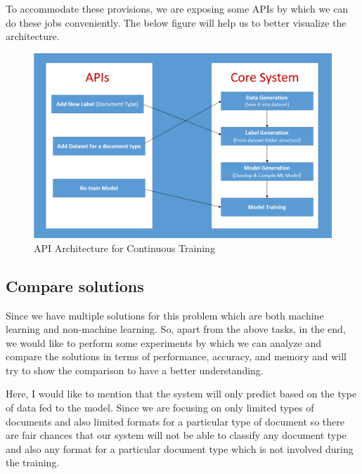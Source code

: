 \par
To accommodate these provisions, we are exposing some APIs by which we can do these jobs conveniently. The below figure will help us to better visualize the architecture.
\begin{figure}[H]
\centering
\includegraphics[scale=0.7]{images/Chapter1/API.PNG}
\caption{API Architecture for Continuous Training}
\label{api-arch-ct}
\end{figure}
\par
\subsection{Compare solutions}
Since we have multiple solutions for this problem which are both machine learning and non-machine learning. So, apart from the above tasks, in the end, we would like to perform some experiments by which we can analyze and compare the solutions in terms of performance, accuracy, and memory and will try to show the comparison to have a better understanding.
\par
Here, I would like to mention that the system will only predict based on the type of data fed to the model. Since we are focusing on only limited types of documents and also limited formats for a particular type of document so there are fair chances that our system will not be able to classify any document type and also any format for a particular document type which is not involved during the training.
